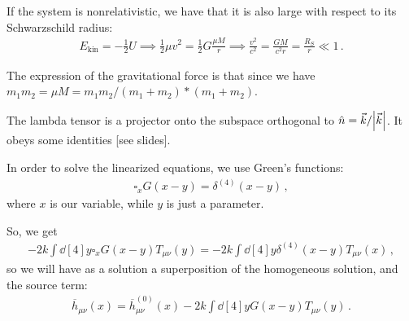 \documentclass[main.tex]{subfiles}
\begin{document}
If the system is nonrelativistic, we have that it is also large with respect to its Schwarzschild radius:
%
\begin{align}
E _{\text{kin}} = - \frac{1}{2} U \implies 
\frac{1}{2} \mu v^2 = \frac{1}{2} G \frac{\mu M}{r} \implies \frac{v^2}{c^2} = \frac{GM}{c^2 r} = \frac{R_S}{r} \ll 1
\,.
\end{align}

The expression of the gravitational force is that since we have \(m_1 m_2 = \mu M = m_1 m_2 /  (m_1 + m_2 ) * (m_1 + m_2 )\). 

The lambda tensor is a projector onto the subspace orthogonal to \(\hat{n} = \vec{k} / \abs{\vec{k}}\). 
It obeys some identities [see slides].

In order to solve the linearized equations, we use Green's functions: 
%
\begin{align}
\square_x G(x -y) = \delta^{(4)} (x-y)
\,,
\end{align}
%
where \(x\) is our variable, while \(y\) is just a parameter. 

So, we get 
%
\begin{align}
-2k \int \dd[4]{y} \square_x G(x-y) T_{\mu \nu } (y) = -2k \int \dd[4]{y} \delta^{(4)} (x-y) T_{\mu \nu }(x)
\,,
\end{align}
%
so we will have as a solution a superposition of the homogeneous solution, and the source term:
%
\begin{align}
\overline{h}_{\mu \nu } (x) = \overline{h}^{(0)}_{\mu \nu }(x)
- 2k \int \dd[4]{y} G(x-y) T_{\mu \nu }(y)
\,.
\end{align}
\end{document}
